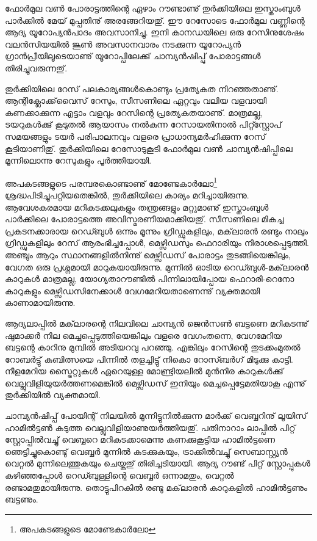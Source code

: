 ﻿
\vskip 2pt

ഫോര്‍മുല വണ്‍ പോരാട്ടത്തിന്റെ ഏഴാം റൗണ്ടാണു് തുര്‍ക്കിയിലെ ഇസ്താംബുള്‍ പാര്‍ക്കില്‍ മേയ് മുപ്പതിനു് 
അരങ്ങേറിയതു്. ഈ റേസോടെ ഫോര്‍മുല വണ്ണിന്റെ ആദ്യ യൂറോപ്യന്‍പാദം അവസാനിച്ചു. ഇനി കാനഡയിലെ 
ഒരു റേസിനുശേഷം വലന്‍സിയയില്‍ ജൂണ്‍ അവസാനവാരം നടക്കുന്ന യൂറോപ്യന്‍ ഗ്രാന്‍പ്രീയിലൂടെയാണു് 
യൂറോപ്പിലേക്കു് ചാമ്പ്യന്‍ഷിപ്പു് പോരാട്ടങ്ങള്‍ തിരിച്ചുവരുന്നതു്.

തുര്‍ക്കിയിലെ റേസ് പലകാര്യങ്ങള്‍കൊണ്ടും പ്രത്യേകത നിറഞ്ഞതാണു്. ആന്റിക്ലോക്ക്‌വൈസ് റേസും, സീസണിലെ 
ഏറ്റവും വലിയ വളവായി കണക്കാക്കുന്ന എട്ടാം വളവും റേസിന്റെ പ്രത്യേകതയാണു്. മാത്രമല്ല, ടയറുകള്‍ക്കു് കൂടുതല്‍ 
ആയാസം നല്‍കുന്ന റേസായതിനാല്‍ പിറ്റ്സ്റ്റോപ് സമയങ്ങളും ടയര്‍ പരിപാലനവും വളരെ പ്രാധാന്യമര്‍ഹിക്കുന്ന 
റേസ് കൂടിയാണിതു്. തുര്‍ക്കിയിലെ റേസോടുകൂടി ഫോര്‍മുല വണ്‍ ചാമ്പ്യന്‍ഷിപ്പിലെ മൂന്നിലൊന്നു റേസുകളും പൂര്‍ത്തിയായി.

അപകടങ്ങളുടെ പരമ്പരകൊണ്ടാണു് മോണ്ടേകാര്‍ലോ\footnote{അപകടങ്ങളുടെ മോണ്ടേകാര്‍ലോ} ശ്രദ്ധപിടിച്ചുപറ്റിയതെങ്കില്‍, 
തുര്‍ക്കിയിലെ കാര്യം മറിച്ചായിരുന്നു. ആവേശകരമായ മറികടക്കലുകളും തന്ത്രങ്ങളും 
മറ്റുമാണു് ഇസ്താംബുള്‍ പാര്‍ക്കിലെ പോരാട്ടത്തെ അവിസ്മരണീയമാക്കിയതു്. 
സീസണിലെ മികച്ച പ്രകടനക്കാരായ റെഡ്ബുള്‍ ഒന്നും മൂന്നും ഗ്രിഡ്ഡുകളിലും, മക്‌ലാരന്‍ രണ്ടും നാലും ഗ്രിഡ്ഡുകളിലും റേസ് 
ആരംഭിച്ചപ്പോള്‍, മെഴ്സിഡസും ഫെറാരിയും നിരാശപ്പെടുത്തി. അഞ്ചും ആറും സ്ഥാനങ്ങളില്‍നിന്നു് മെഴ്സിഡസ് പോരാട്ടം 
തുടങ്ങിയെങ്കിലും, വേഗത ഒരു പ്രശ്നമായി മാറുകയായിരുന്നു. മുന്നില്‍ ഓടിയ റെഡ്ബുള്‍-മക്‌ലാരന്‍ കാറുകള്‍ മാത്രമല്ല, 
യോഗ്യതാറൗണ്ടില്‍ പിന്നിലായിപ്പോയ ഫെറാരി-റെനോ കാറുകളും മെഴ്സിഡസിനേക്കാള്‍ വേഗമേറിയതാണെന്നു് 
വ്യക്തമായി കാണാമായിരുന്നു.

ആദ്യലാപ്പില്‍ മക്‌ലാരന്റെ നിലവിലെ ചാമ്പ്യന്‍ ജെന്‍സണ്‍ ബട്ടണെ മറികടന്നു് ഷുമാക്കര്‍ നില മെച്ചപ്പെടുത്തിയെങ്കിലും 
വളരെ വേഗംതന്നെ, വേഗമേറിയ ബട്ടന്റെ കാറിനു മുമ്പില്‍ അടിയറവു പറഞ്ഞു. എങ്കിലും റേസിന്റെ തുടക്കംമുതല്‍ റോബര്‍ട്ടു് 
കുബിത്സയെ പിന്നില്‍ തളച്ചിട്ടു് നികൊ റോസ്ബര്‍ഗ് മിടുക്കു കാട്ടി. നീളമേറിയ സ്ട്രൈറ്റുകള്‍ ഏറെയുള്ള മോണ്ട്രിയലില്‍ 
മുന്‍നിര കാറുകള്‍ക്കു് വെല്ലുവിളിയുയര്‍ത്തണമെങ്കില്‍ മെഴ്സിഡസ് ഇനിയും മെച്ചപ്പെട്ടേമതിയാകൂ എന്നു് തുര്‍ക്കിയില്‍ 
വ്യക്തമായി.

ചാമ്പ്യന്‍ഷിപ്പ് പോയിന്റ് നിലയില്‍ മുന്നിട്ടുനില്‍ക്കുന്ന മാര്‍ക്ക് വെബ്ബറിനു് ലൂയിസ് ഹാമില്‍ട്ടണ്‍ കടുത്ത 
വെല്ലുവിളിയാണുയര്‍ത്തിയതു്.  പതിനാറാം ലാപ്പില്‍ പിറ്റ് സ്റ്റോപ്പില്‍വച്ചു് വെബ്ബറെ മറികടക്കാമെന്നു കണക്കുകൂട്ടിയ 
ഹാമില്‍ട്ടണെ ഞെട്ടിച്ചുകൊണ്ടു് വെബ്ബര്‍ മുന്നില്‍ കടക്കുകയും, ട്രാക്കില്‍വച്ചു് സെബാസ്റ്റ്യന്‍ വെറ്റല്‍ മുന്നിലെത്തുകയും 
ചെയ്തതു് തിരിച്ചടിയായി. ആദ്യ റൗണ്ട് പിറ്റ് സ്റ്റോപ്പുകള്‍ കഴിഞ്ഞപ്പോള്‍ റെഡ്ബുള്ളിന്റെ വെബ്ബര്‍ ഒന്നാമതും, 
വെറ്റല്‍ രണ്ടാമതുമായിരുന്നു. തൊട്ടുപിറകില്‍ രണ്ടു മക്‌ലാരന്‍ കാറുകളില്‍ ഹാമില്‍ട്ടണും ബട്ടണും.

